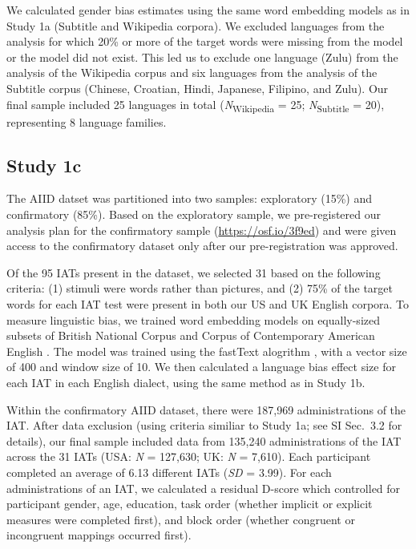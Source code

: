 \documentclass[9pt,twocolumn,twoside,lineno]{pnas-new}
\begin{document}
{We calculated gender bias estimates using the same word embedding models
as in Study 1a (Subtitle and Wikipedia corpora). We excluded languages
from the analysis for which 20\% or more of the target words were
missing from the model or the model did not exist. This led us to
exclude one language (Zulu) from the analysis of the Wikipedia corpus
and six languages from the analysis of the Subtitle corpus (Chinese,
Croatian, Hindi, Japanese, Filipino, and Zulu). Our final sample
included 25 languages in total (\emph{N}\textsubscript{Wikipedia} = 25;
\emph{N}\textsubscript{Subtitle} = 20), representing 8 language
families. 


\subsection*{Study 1c}

The AIID datset was partitioned into two samples: exploratory (15\%) and
confirmatory (85\%). Based on the exploratory sample, we pre-registered
our analysis plan for the confirmatory sample
(\url{https://osf.io/3f9ed}) and were given access to the confirmatory dataset only after our pre-registration was approved. 

Of the 95 IATs present in the dataset, we selected 31 based on the following criteria: (1) stimuli were words rather than pictures, and (2) 75\% of the target words for each IAT test were present in both our US and UK English corpora. To measure linguistic bias, we trained word embedding models on equally-sized subsets of British National Corpus \citep[BNC;][]{burnard1995users} and Corpus of Contemporary American English \citep[COCA;][]{davies2008corpus}. The model was trained using the fastText alogrithm \cite{joulin2016bag}, with a vector size of 400 and  window size of 10. We then calculated a language bias effect size for each IAT in each English dialect, using the same method as in Study 1b. 


Within the confirmatory AIID dataset, there were 187,969 administrations
of the IAT. After data exclusion (using criteria similiar to Study 1a; see SI Sec.\ 3.2 for details), our final sample
included data from 135,240 administrations of the IAT across the 31 IATs (USA: \emph{N} = 127,630; UK: \emph{N} = 7,610). Each participant
completed an average of 6.13 different IATs (\emph{SD} = 3.99). For each administrations of an IAT, we calculated a residual D-score which controlled for participant gender, age, education, task order (whether implicit or explicit measures were completed first), and block order (whether congruent or incongruent mappings occurred first).

}
\end{document}

